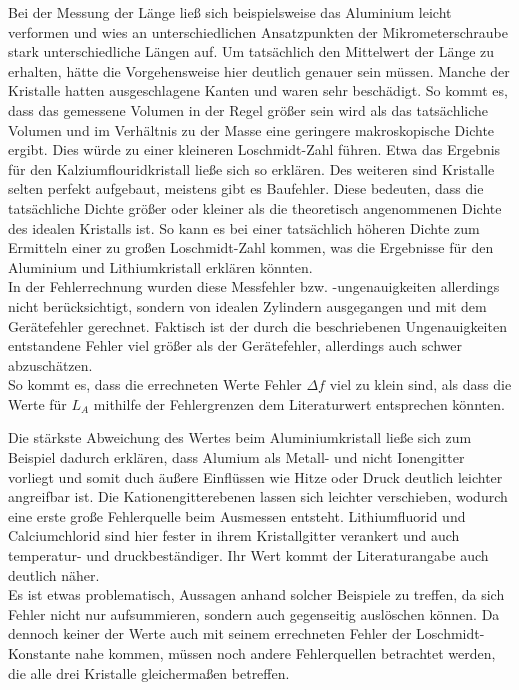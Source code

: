 \documentclass[12pt,a4paper,titlepage,headinclude,bibtotoc]{scrartcl}
\begin{document}
Bei der Messung der Länge ließ sich beispielsweise das Aluminium leicht verformen und wies an unterschiedlichen Ansatzpunkten der Mikrometerschraube stark unterschiedliche Längen auf. Um tatsächlich den Mittelwert der Länge zu erhalten, hätte die Vorgehensweise hier deutlich genauer sein müssen. Manche der Kristalle hatten ausgeschlagene Kanten und waren sehr beschädigt. So kommt es, dass das gemessene Volumen in der Regel größer sein wird als das tatsächliche Volumen und im Verhältnis zu der Masse eine geringere makroskopische Dichte ergibt. Dies würde zu einer kleineren Loschmidt-Zahl führen. Etwa das Ergebnis für den Kalziumflouridkristall ließe sich so erklären. Des weiteren sind Kristalle selten perfekt aufgebaut, meistens gibt es Baufehler. Diese bedeuten, dass die tatsächliche Dichte größer oder kleiner als die theoretisch angenommenen Dichte des idealen Kristalls ist. So kann es bei einer tatsächlich höheren Dichte zum Ermitteln einer zu großen Loschmidt-Zahl kommen, was die Ergebnisse für den Aluminium und Lithiumkristall erklären könnten.\\

In der Fehlerrechnung wurden diese Messfehler bzw. -ungenauigkeiten allerdings nicht berücksichtigt, sondern von idealen Zylindern ausgegangen und mit dem Gerätefehler gerechnet. Faktisch ist der durch die beschriebenen Ungenauigkeiten entstandene Fehler viel größer als der Gerätefehler, allerdings auch schwer abzuschätzen. \\
So kommt es, dass die errechneten Werte Fehler $\Delta f$ viel zu klein sind, als dass die Werte für $L_A$ mithilfe der Fehlergrenzen dem Literaturwert entsprechen könnten.

Die stärkste Abweichung des Wertes beim Aluminiumkristall ließe sich zum Beispiel dadurch erklären, dass Alumium als Metall- und nicht Ionengitter vorliegt und somit duch äußere Einflüssen wie Hitze oder Druck deutlich leichter angreifbar ist. Die Kationengitterebenen lassen sich leichter verschieben, wodurch eine erste große Fehlerquelle beim Ausmessen entsteht. Lithiumfluorid und Calciumchlorid sind hier fester in ihrem Kristallgitter verankert und auch temperatur- und druckbeständiger. Ihr Wert kommt der Literaturangabe auch deutlich näher. \\
Es ist etwas problematisch, Aussagen anhand solcher Beispiele zu treffen, da sich Fehler nicht nur aufsummieren, sondern auch gegenseitig auslöschen können. Da dennoch keiner der Werte auch mit seinem errechneten Fehler der Loschmidt-Konstante nahe kommen, müssen noch andere Fehlerquellen betrachtet werden, die alle drei Kristalle gleichermaßen betreffen.
\end{document}
